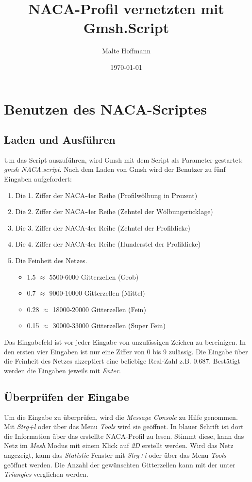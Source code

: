 \documentclass[a4paper,twocolumn]{article}
\title{NACA-Profil vernetzten mit Gmsh.Script}
\author{Malte Hoffmann}
\date{\today{}}
\begin{document}
\maketitle{}

\clearpage

\section{Benutzen des NACA-Scriptes}

\subsection{Laden und Ausführen}
Um das Script auszuführen, wird Gmsh mit dem Script als Parameter gestartet: \textit{gmsh NACA.script}. Nach dem Laden von Gmsh wird der Benutzer
zu fünf Eingaben aufgefordert:
\begin{enumerate}
\item Die 1. Ziffer der NACA-4er Reihe (Profilwölbung in Prozent)
\item Die 2. Ziffer der NACA-4er Reihe (Zehntel der Wölbungsrücklage)
\item Die 3. Ziffer der NACA-4er Reihe (Zehntel der Profildicke)
\item Die 4. Ziffer der NACA-4er Reihe (Hunderstel der Profildicke)
\item Die Feinheit des Netzes. \begin{itemize}
				\item 1.5 $\approx$ 5500-6000 Gitterzellen (Grob)
				\item 0.7 $\approx$ 9000-10000 Gitterzellen (Mittel)
				\item 0.28 $\approx$ 18000-20000 Gitterzellen (Fein)
				\item 0.15 $\approx$ 30000-33000 Gitterzellen (Super Fein)
			       \end{itemize}
\end{enumerate}
Das Eingabefeld ist vor jeder Eingabe von unzulässigen Zeichen zu bereinigen. In den ersten vier Eingaben ist nur eine Ziffer von 0 bis 9 zulässig.
 Die Eingabe über die Feinheit des Netzes akzeptiert eine beliebige Real-Zahl z.B. 0.687. Bestätigt werden die Eingaben jeweils mit \textit{Enter}.

\subsection{Überprüfen der Eingabe}
Um die Eingabe zu überprüfen, wird die \textit{Message Console} zu Hilfe genommen. Mit \emph{Strg+l} oder über das Menu \emph{Tools} wird sie geöffnet.
 In blauer Schrift ist dort die Information über das erstellte NACA-Profil zu lesen. Stimmt diese, kann das Netz im \emph{Mesh} Modus mit einem Klick 
auf \emph{2D} erstellt werden. Wird das Netz angezeigt, kann das \textit{Statistic} Fenster mit \emph{Strg+i} oder über das Menu \emph{Tools} geöffnet werden.
 Die Anzahl der gewünschten Gitterzellen kann mit der unter \textit{Triangles} verglichen werden.
\end{document}
